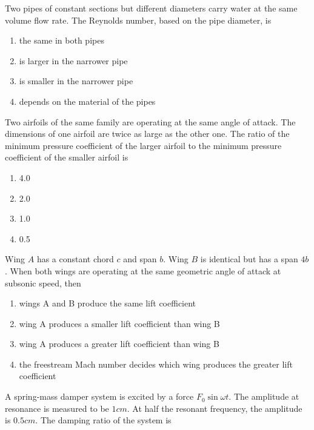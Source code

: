 \item Two pipes of constant sections but different diameters carry water
at the same volume flow rate. The Reynolds number, based on the pipe diameter, is


\begin{multicols}{2}
    \begin{enumerate}
        \item the same in both pipes
        \item is larger in the narrower pipe
        \item is smaller in the narrower pipe
        \item depends on the material of the pipes
    \end{enumerate}
\end{multicols}

\item Two airfoils of the same family are operating at the same angle of attack. The
dimensions of one airfoil are twice as large as the other one. The ratio of the
minimum pressure coefficient of the larger airfoil to the minimum pressure coefficient
of the smaller airfoil is

\begin{multicols}{4}
    \begin{enumerate}
        \item 4.0
        \item 2.0
        \item 1.0
        \item 0.5
    \end{enumerate}
\end{multicols}

\item Wing $A$ has a constant chord $c$ and span $b$. Wing $B$ is identical but has a span
$4b$. When both wings are operating at the same geometric angle of attack at subsonic speed, then

\begin{enumerate}
    \item wings A and B produce the same lift coefficient
    \item wing A produces a smaller lift coefficient than wing B
    \item wing A produces a greater lift coefficient than wing B
    \item the freestream Mach number decides which wing produces the greater lift coefficient
\end{enumerate}

\item A spring-mass damper system is excited by a force $F_0\sin\omega t$. The amplitude at resonance
is measured to be $1 cm$. At half the resonant frequency, the amplitude is $0.5 cm$. The damping ratio
of the system is

